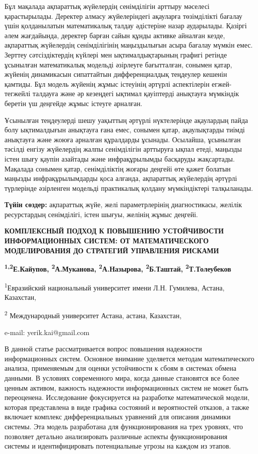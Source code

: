 Бұл мақалада ақпараттық жүйелердің сенімділігін арттыру мәселесі
қарастырылады. Деректер алмасу жүйелеріндегі ақауларға төзімділікті
бағалау үшін қолданылатын математикалық талдау әдістеріне назар
аударылады. Қазіргі әлем жағдайында, деректер барған сайын құнды активке
айналған кезде, ақпараттық жүйелердің сенімділігінің маңыздылығын асыра
бағалау мүмкін емес. Зерттеу сәтсіздіктердің күйлері мен
ықтималдықтарының графигі ретінде ұсынылған математикалық модельді
әзірлеуге бағытталған, сонымен қатар, жүйенің динамикасын сипаттайтын
дифференциалдық теңдеулер кешенін қамтиды. Бұл модель жүйенің жұмыс
істеуінің әртүрлі аспектілерін егжей-тегжейлі талдауға және әр кезеңдегі
ықтимал қауіптерді анықтауға мүмкіндік беретін үш деңгейде жұмыс істеуге
арналған.

Ұсынылған теңдеулерді шешу уақыттың әртүрлі нүктелерінде ақаулардың
пайда болу ықтималдығын анықтауға ғана емес, сонымен қатар, ақаулықтарды
тиімді анықтауға және жоюға арналған құралдарды ұсынады. Осылайша,
ұсынылған тәсілді енгізу жүйелердің жалпы сенімділігін арттыруға ықпал
етеді, маңызды істен шығу қаупін азайтады және инфрақұрылымды басқаруды
жақсартады. Мақалада сонымен қатар, сенімділіктің жоғары деңгейі өте
қажет болатын маңызды инфрақұрылымдарды қоса алғанда, ақпараттық
жүйелердің әртүрлі түрлерінде әзірленген модельді практикалық қолдану
мүмкіндіктері талқыланады.

{\bfseries Түйін сөздер:} ақпараттық жүйе, желі параметрлерінің
диагностикасы, желілік ресурстардың сенімділігі, істен шығуы, желінің
жұмыс деңгейі.

\begin{center}
{\large\bfseries КОМПЛЕКСНЫЙ ПОДХОД К ПОВЫШЕНИЮ УСТОЙЧИВОСТИ ИНФОРМАЦИОННЫХ
СИСТЕМ: ОТ МАТЕМАТИЧЕСКОГО МОДЕЛИРОВАНИЯ ДО СТРАТЕГИЙ УПРАВЛЕНИЯ
РИСКАМИ}

{\bfseries \textsuperscript{1,2}Е.Кайупов, \textsuperscript{2}А.Муканова,
\textsuperscript{2}А.Назырова, \textsuperscript{2}Б.Таштай,
\textsuperscript{2}Т.Толеубеков}

\textsuperscript{1}Евразийский национальный университет имени Л.Н.
Гумилева, Астана, Казахстан,

\textsuperscript{2} Международный университет Астана, астана, Казахстан,

e-mail: yerik.kai@gmail.com
\end{center}

В данной статье рассматривается вопрос повышения надежности
информационных систем. Основное внимание уделяется методам
математического анализа, применяемым для оценки устойчивости к сбоям в
системах обмена данными. В условиях современного мира, когда данные
становятся все более ценным активом, важность надежности информационных
систем не может быть переоценена. Исследование фокусируется на
разработке математической модели, которая представлена в виде графика
состояний и вероятностей отказов, а также включает комплекс
дифференциальных уравнений для описания динамики системы. Эта модель
разработана для функционирования на трех уровнях, что позволяет детально
анализировать различные аспекты функционирования системы и
идентифицировать потенциальные угрозы на каждом из этапов.

